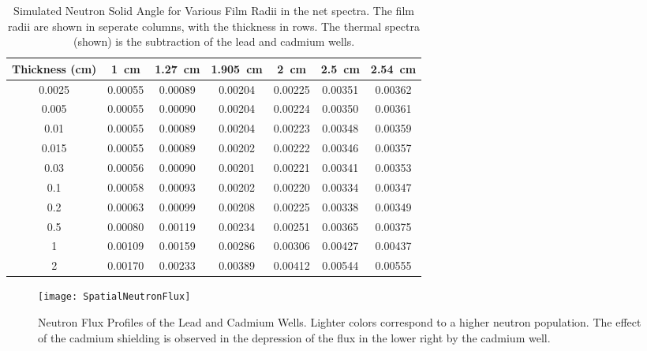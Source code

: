 \documentclass[draftcls,onecolumn]{IEEEtran}
\begin{document}
\begin{table}
	\centering
	\caption[Simulated Thermal Neutron Solid Angle for Various Film Radii]{Simulated Neutron Solid Angle for Various Film Radii in the net spectra. The film radii are shown in seperate columns, with the thickness in rows. The thermal spectra (shown) is the subtraction of the lead and cadmium wells.}
	\label{tab:NeutronSolidAngle}
	\begin{tabular}{c | c c c c c c}
Thickness (\si{\cm})	&	\SI{1}{\cm}	&	\SI{1.27}{\cm}	&	\SI{1.905}{\cm}	&	\SI{2}{\cm}	&	\SI{2.5}{\cm}	&	\SI{2.54}{\cm} \\ \hline
0.0025	&	0.00055	&	0.00089	&	0.00204	&	0.00225	&	0.00351	&	0.00362	\\
0.005	&	0.00055	&	0.00090	&	0.00204	&	0.00224	&	0.00350	&	0.00361	\\
0.01	&	0.00055	&	0.00089	&	0.00204	&	0.00223	&	0.00348	&	0.00359	\\
0.015	&	0.00055	&	0.00089	&	0.00202	&	0.00222	&	0.00346	&	0.00357	\\
0.03	&	0.00056	&	0.00090	&	0.00201	&	0.00221	&	0.00341	&	0.00353	\\
0.1	&	0.00058	&	0.00093	&	0.00202	&	0.00220	&	0.00334	&	0.00347	\\
0.2	&	0.00063	&	0.00099	&	0.00208	&	0.00225	&	0.00338	&	0.00349	\\
0.5	&	0.00080	&	0.00119	&	0.00234	&	0.00251	&	0.00365	&	0.00375	\\
1	&	0.00109	&	0.00159	&	0.00286	&	0.00306	&	0.00427	&	0.00437	\\
2	&	0.00170	&	0.00233	&	0.00389	&	0.00412	&	0.00544	&	0.00555	\\
	\end{tabular}
\end{table}
\begin{figure}
	\texttt{[image: SpatialNeutronFlux]}
  \caption[Neutron Flux Profiles of the Lead and Cadmium Wells]{Neutron Flux Profiles of the Lead and Cadmium Wells. Lighter colors correspond to a higher neutron population. The effect of the cadmium shielding is observed in the depression of the flux in the lower right by the cadmium well.}
  \label{fig:NeutronFluxProfiles}
\end{figure}
\end{document}
